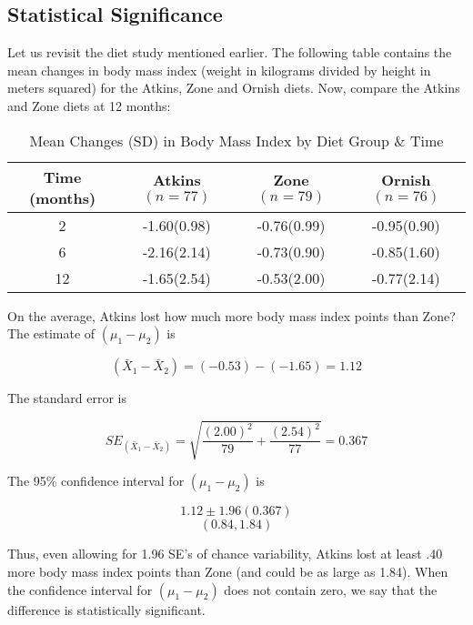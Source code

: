 \documentclass[11pt]{book}\usepackage[]{graphicx}\usepackage[]{color}
\begin{document}
\subsection{Statistical Significance}

Let us revisit the diet study mentioned earlier.  The following table contains the mean changes in body mass index (weight in kilograms divided by height in meters squared) for the Atkins, Zone and Ornish diets. Now, compare the Atkins and Zone diets at 12 months:

\begin{table}[ht]
\centering
\caption{Mean Changes (SD) in Body Mass Index by Diet Group \& Time}
\begin{tabular}{@{} cccc @{}} \hline
Time (months) & Atkins $(n = 77)$ & Zone $(n = 79)$ & Ornish $(n = 76)$ \\ \hline
2 & -1.60(0.98) & -0.76(0.99) & -0.95(0.90) \\
6 & -2.16(2.14) & -0.73(0.90) & -0.85(1.60) \\
12 & -1.65(2.54) & -0.53(2.00) & -0.77(2.14) \\ \hline
\end{tabular}
\end{table}

On the average, Atkins lost how much more body mass index points than Zone?  The estimate of $(\mu_1 - \mu_2)$ is

\begin{equation*}
  (\bar{X}_1 - \bar{X}_2) = (-0.53) - (-1.65) = 1.12
\end{equation*}

The standard error is 

\begin{equation*}
  SE_{(\bar{X}_1 - \bar{X}_2)} = \sqrt{ \frac{(2.00)^2}{79} + \frac{(2.54)^2}{77}} = 0.367
\end{equation*}

The 95\% confidence interval for $(\mu_1 - \mu_2)$ is

\begin{equation*}
  1.12 \pm 1.96 (0.367)
\end{equation*}
\begin{equation*}
(0.84, 1.84)
\end{equation*}

Thus, even allowing for 1.96 SE's of chance variability, Atkins lost at least .40 more body mass index points than Zone (and could be as large as 1.84).   When the confidence interval for $(\mu_1 - \mu_2)$  does not contain zero, we say that the difference is statistically significant.  
\end{document}
